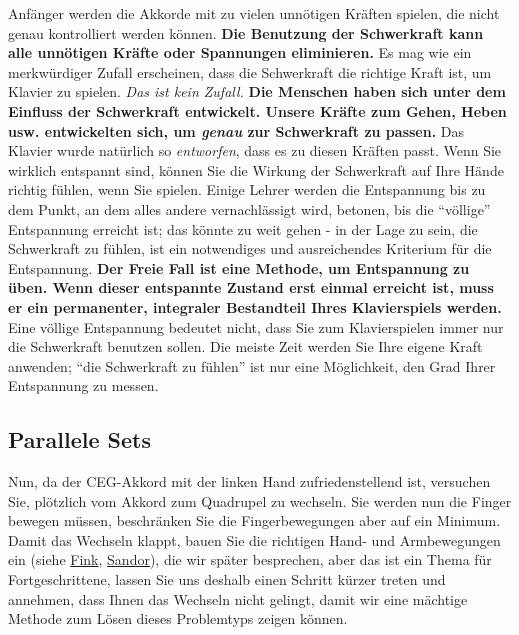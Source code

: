 Anfänger werden die Akkorde mit zu vielen unnötigen Kräften spielen, die nicht genau kontrolliert werden können.
\textbf{Die Benutzung der Schwerkraft kann alle unnötigen Kräfte oder Spannungen eliminieren.}
Es mag wie ein merkwürdiger Zufall erscheinen, dass die Schwerkraft die richtige Kraft ist, um Klavier zu spielen.
\textit{Das ist kein Zufall.}
\textbf{Die Menschen haben sich unter dem Einfluss der Schwerkraft entwickelt.
Unsere Kräfte zum Gehen, Heben usw. entwickelten sich, um \textit{genau} zur Schwerkraft zu passen.}
Das Klavier wurde natürlich so \textit{entworfen}, dass es zu diesen Kräften passt.
Wenn Sie wirklich entspannt sind, können Sie die Wirkung der Schwerkraft auf Ihre Hände richtig fühlen, wenn Sie spielen.
Einige Lehrer werden die Entspannung bis zu dem Punkt, an dem alles andere vernachlässigt wird, betonen, bis die \enquote{völlige} Entspannung erreicht ist; das könnte zu weit gehen - in der Lage zu sein, die Schwerkraft zu fühlen, ist ein notwendiges und ausreichendes Kriterium für die Entspannung.
\textbf{Der Freie Fall ist eine Methode, um Entspannung zu üben.
Wenn dieser entspannte Zustand erst einmal erreicht ist, muss er ein permanenter, integraler Bestandteil Ihres Klavierspiels werden.}
Eine völlige Entspannung bedeutet nicht, dass Sie zum Klavierspielen immer nur die Schwerkraft benutzen sollen.
Die meiste Zeit werden Sie Ihre eigene Kraft anwenden; \enquote{die Schwerkraft zu fühlen} ist nur eine Möglichkeit, den Grad Ihrer Entspannung zu messen.


\subsection{Parallele Sets}
\label{c1ii11}

Nun, da der CEG-Akkord mit der linken Hand zufriedenstellend ist, versuchen Sie, plötzlich vom Akkord zum Quadrupel zu wechseln.
Sie werden nun die Finger bewegen müssen, beschränken Sie die Fingerbewegungen aber auf ein Minimum.
Damit das Wechseln klappt, bauen Sie die richtigen Hand- und Armbewegungen ein (siehe \hyperref[Fink]{Fink}, \hyperref[Sandor]{Sandor}), die wir später besprechen, aber das ist ein Thema für Fortgeschrittene, lassen Sie uns deshalb einen Schritt kürzer treten und annehmen, dass Ihnen das Wechseln nicht gelingt, damit wir eine mächtige Methode zum Lösen dieses Problemtyps zeigen können.


